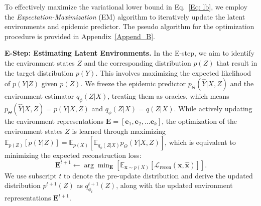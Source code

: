 {To effectively maximize the variational lower bound in Eq.~\eqref{Eq: lb}, we employ the \textit{Expectation-Maximization} (EM) algorithm to iteratively update the latent environments and epidemic predictor. The pseudo algorithm for the optimization procedure is provided in Appendix~\ref{Append_B}. 


\textbf{E-Step: Estimating Latent Environments.} In the E-step, we aim to identify the environment states \( Z \) and the corresponding distribution \( p(Z) \) that result in the target distribution $p(Y)$. This involves maximizing the expected likelihood of $p(Y | Z)$ given $p(Z)$. We freeze the epidemic predictor $p_\Theta(\hat{Y}|X,Z)$ and the environment estimator $q_\phi(Z|X)$, treating them as oracles, which means $p_\Theta(\hat{Y}|X,Z) = p(Y|X,Z)$ and $q_\phi(Z|X)=q(Z|X)$. While actively updating the environment representations $\mathbf{E}=[\mathbf{e}_1, \mathbf{e}_2, ... \mathbf{e}_k]$, the optimization of the environment states $Z$ is learned through maximizing $\mathbb{E}_{p(Z)} [p(Y|Z)] = \mathbb{E}_{p(X)} [\mathbb{E}_{q_\phi(Z|X)} p_\Theta(Y|X, Z)]$, which is equivalent to minimizing the expected reconstruction loss: 
\begin{equation}
\mathbf{E}^{t+1} \leftarrow \arg\min\nolimits_{\mathbf{E}} \left[  \mathbb{E}_{\mathbf{x} \sim p(X)} [\mathcal{L}_{\text{recon}}(\mathbf{x}, \hat{\mathbf{x}})] \right].
\end{equation}
We use subscript \( t \) to denote the pre-update distribution  and derive the updated distribution $p^{t+1}(Z)$ as $q^{t+1}_{\phi_t}(Z)$, along with the updated environment representations \( \mathbf{E}^{t+1} \).


}
